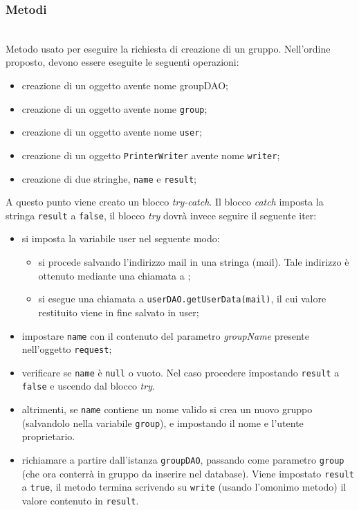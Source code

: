 \subsubsection*{Metodi}
\begin{description}
	\item{}\\	
	Metodo usato per eseguire la richiesta di creazione di un gruppo. Nell'ordine proposto, devono essere eseguite le seguenti operazioni:
	\begin{itemize}
		\item creazione di un oggetto  avente nome groupDAO;
		\item creazione di un oggetto  avente nome \texttt{group};
		\item creazione di un oggetto  avente nome \texttt{user};
		\item creazione di un oggetto \texttt{PrinterWriter} avente nome \texttt{writer};
		\item creazione di due stringhe, \texttt{name} e \texttt{result};
	\end{itemize}
	A questo punto viene creato un blocco \textit{try-catch}. Il blocco \textit{catch} imposta la stringa \texttt{result} a \texttt{false}, il blocco \textit{try} dovrà invece seguire il seguente iter:
	\begin{itemize}
		\item si imposta la variabile user nel seguente modo:
			\begin{itemize}
				\item si procede salvando l'indirizzo mail in una stringa (mail). Tale indirizzo è ottenuto mediante una chiamata a ;
				\item si esegue una chiamata a \texttt{userDAO.getUserData(mail)}, il cui valore restituito viene in fine salvato in user;
			\end{itemize}
		\item impostare \texttt{name} con il contenuto del parametro \textit{groupName} presente nell'oggetto \texttt{request};
		\item verificare se \texttt{name} è \texttt{null} o vuoto. Nel caso procedere impostando \texttt{result} a \texttt{false} e uscendo dal blocco \textit{try}.
		\item altrimenti, se \texttt{name} contiene un nome valido si crea un nuovo gruppo (salvandolo nella variabile \texttt{group}), e impostando il nome e l'utente proprietario.
		\item richiamare  a partire dall'istanza \texttt{groupDAO}, passando come parametro \texttt{group} (che ora conterrà in gruppo da inserire nel database). Viene impostato \texttt{result} a \texttt{true},
	il metodo termina scrivendo su \texttt{write} (usando l'omonimo metodo) il valore contenuto in \texttt{result}. 		
	\end{itemize}
	
\end{description}


